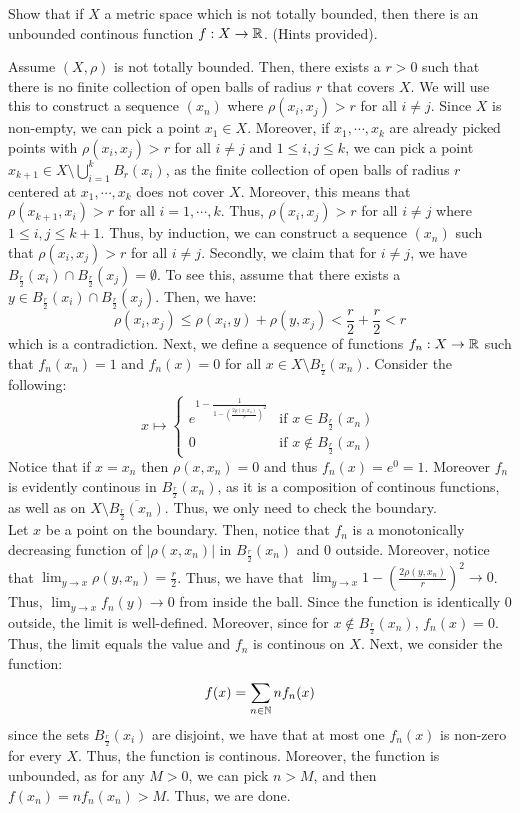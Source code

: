 \documentclass[12pt]{article}
\begin{document}
\begin{problab}{6} 
    Show that if $X$ a metric space which is not totally bounded, then there is an unbounded continous function $f: X \to \mathbb R$. (Hints provided).
\end{problab}

\begin{solu}
    Assume $(X, \rho)$ is not totally bounded. Then, there exists a $r > 0$ such that there is no finite collection of open balls of radius $r$ that covers $X$. We will use this to construct a sequence $(x_n)$ where $\rho(x_i, x_j) > r$ for all $i \neq j$. \bbni
    Since $X$ is non-empty, we can pick a point $x_1 \in X$. Moreover, if $x_1, \cdots, x_k$ are already picked points with $\rho(x_i, x_j) > r$ for all $i \neq j$ and $1 \leq i,j \leq k$, we can pick a point $x_{k+1} \in X \setminus \bigcup_{i=1}^k B_r(x_i)$, as the finite collection of open balls of radius $r$ centered at $x_1, \cdots, x_k$ does not cover $X$. Moreover, this means that $\rho(x_{k+1}, x_i) > r$ for all $i = 1, \cdots, k$. Thus, $\rho(x_i, x_j) > r$ for all $i\neq j$ where $1 \leq i, j \leq k+1$. Thus, by induction, we can construct a sequence $(x_n)$ such that $\rho(x_i, x_j) > r$ for all $i \neq j$. \bbni
    Secondly, we claim that for $i \neq j$, we have $B_{\frac r2}(x_i) \cap B_{\frac r2}(x_j) = \emptyset$. To see this, assume that there exists a $y \in B_{\frac r2}(x_i) \cap B_{\frac r2}(x_j)$. Then, we have:
    \[ \rho(x_i, x_j) \leq \rho(x_i, y) + \rho(y, x_j) < \frac r2 + \frac r2 < r\]
    which is a contradiction. \bbni
    Next, we define a sequence of functions $f_n: X \to \mathbb R$ such that $f_n(x_n) = 1$ and $f_n(x) = 0$ for all $x \in X \setminus B_{\frac r2}(x_n)$. Consider the following: 
    \[ x \mapsto \begin{cases}
        e^{1-\frac{1}{1-\left(\frac{2\rho(x,x_n)}{r}\right)^2}} & \text{if } x \in B_{\frac r2}(x_n) \\
        0 & \text{if } x \not \in B_{\frac r2}(x_n)
    \end{cases}\]
    Notice that if $x = x_n$ then $\rho(x, x_n) = 0$ and thus $f_n(x) = e^0 = 1$. Moreover $f_n$ is evidently continous in $B_{\frac r2}(x_n)$, as it is a composition of continous functions, as well as on $X \setminus \overline{B_{\frac r2}(x_n)}$. Thus, we only need to check the boundary. \\
    Let $x$ be a point on the boundary. Then, notice that $f_n$ is a monotonically decreasing function of $|\rho(x, x_n)|$ in $B_{\frac r2}(x_n)$ and $0$ outside. Moreover, notice that $\lim_{y \to x} \rho(y,x_n) = \frac r2$. Thus, we have that $\lim_{y\to x} 1-\left(\frac{2\rho(y,x_n)}{r}\right)^2 \to 0$. Thus, $\lim_{y\to x} f_n(y) \to 0$ from inside the ball. Since the function is identically $0$ outside, the limit is well-defined. Moreover, since for $x \not \in B_{\frac r2}(x_n)$, $f_n(x) = 0$. Thus, the limit equals the value and $f_n$ is continous on $X$. \bbni
    Next, we consider the function: 
    \[f(x) = \sum_{n \in \mathbb N} nf_n(x)\]
    since the sets $B_{\frac r2}(x_i)$ are disjoint, we have that at most one $f_n(x)$ is non-zero for every $X$. Thus, the function is continous. Moreover, the function is unbounded, as for any $M > 0$, we can pick $n > M$, and then $f(x_n) = nf_n(x_n) > M$. Thus, we are done.
\end{solu}
\end{document}

